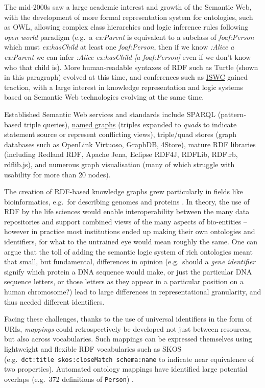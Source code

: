 The mid-2000s saw a large academic interest and growth of the Semantic Web, with the development of more formal representation system for ontologies, such as OWL, allowing complex class hierarchies and logic inference rules following \emph{open world} paradigm (e.g.~a \emph{ex:Parent} is equivalent to a subclass of \emph{foaf:Person} which must \emph{ex:hasChild} at least one \emph{foaf:Person}, then if we know \emph{:Alice a ex:Parent} we can infer \emph{:Alice ex:hasChild {[}a foaf:Person{]}} even if we don't know who that child is). More human-readable syntaxes of RDF such as Turtle (shown in this paragraph) evolved at this time, and conferences such as \href{https://iswc2022.semanticweb.org/}{ISWC} \cite{horrocksSemanticWebISWC2002} gained traction, with a large interest in knowledge representation and logic systems based on Semantic Web technologies evolving at the same time.

Established Semantic Web services and standards include SPARQL \cite{w3-sparql11-overview} (pattern-based triple queries), \href{https://www.w3.org/TR/rdf11-concepts/\#section-dataset}{named graphs} (triples expanded to \emph{quads} to indicate statement source or represent conflicting views), triple/quad stores (graph databases such as OpenLink Virtuoso, GraphDB, 4Store), mature RDF libraries (including Redland RDF, Apache Jena, Eclipse RDF4J, RDFLib, RDF.rb, rdflib.js), and numerous graph visualisation (many of which struggle with usability for more than 20 nodes).

The creation of RDF-based knowledge graphs grew particularly in fields like bioinformatics, e.g.~for describing genomes and proteins \cite{gobleStateNationData2008c,williamsOpenPHACTSSemantic2012c}. In theory, the use of RDF by the life sciences would enable interoperability between the many data repositories and support combined views of the many aspects of bio-entities -- however in practice most institutions ended up making their own ontologies and identifiers, for what to the untrained eye would mean roughly the same. One can argue that the toll of adding the semantic logic system of rich ontologies meant that small, but fundamental, differences in opinion (e.g.~should a \emph{gene identifier} signify which protein a DNA sequence would make, or just the particular DNA sequence letters, or those letters as they appear in a particular position on a human chromosome?) lead to large differences in representational granularity, and thus needed different identifiers.

Facing these challenges, thanks to the use of universal identifiers in the form of URIs, \emph{mappings} could retrospectively be developed not just between resources, but also across vocabularies. Such mappings can be expressed themselves using lightweight and flexible RDF vocabularies such as SKOS \cite{w3-skos-primer} (e.g.~\texttt{dct:title\ skos:closeMatch\ schema:name} to indicate near equivalence of two properties). Automated ontology mappings have identified large potential overlaps (e.g.~372 definitions of \texttt{Person}) \cite{huHowMatchableAre2011a} .


